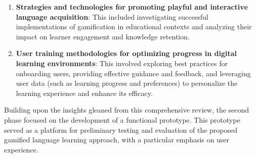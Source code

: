 \documentclass[12pt]{article}
\begin{document}
\begin{enumerate}
    \item \textbf{Strategies and technologies for promoting playful and interactive language acquisition}: This included investigating successful implementations of gamification in educational contexts and analyzing their impact on learner engagement and knowledge retention.
    \item \textbf{User training methodologies for optimizing progress in digital learning environments}: This involved exploring best practices for onboarding users, providing effective guidance and feedback, and leveraging user data (such as learning progress and preferences) to personalize the learning experience and enhance its efficacy.
\end{enumerate}

 

Building upon the insights gleaned from this comprehensive review, the second phase focused on the development of a functional prototype. This prototype served as a platform for preliminary testing and evaluation of the proposed gamified language learning approach, with a particular emphasis on user experience. 
\end{document}

